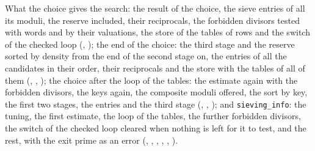 \begin{definition}\label{def:choice}
  \leanok
  What the choice gives the search: the result of the choice, the sieve entries of all its moduli,
  the reserve included, their reciprocals, the forbidden divisors tested with words and by their
  valuations, the store of the tables of rows and the switch of the checked loop
  (, ); the end of the choice: the
  third stage and the reserve sorted by density from the end of the second stage on, the entries of
  all the candidates in their order, their reciprocals and the store with the tables of all of them
  (, ,
  ); the choice after the loop of the tables: the estimate again
  with the forbidden divisors, the keys again, the composite moduli offered, the sort by key, the
  first two stages, the entries and the third stage (,
  , ); and
  \verb|sieving_info|: the tuning, the first estimate, the loop of the tables, the further forbidden
  divisors, the switch of the checked loop cleared when nothing is left for it to test, and the
  rest, with the exit prime as an error (,
  , ,
  , ,
  ).
\end{definition}

